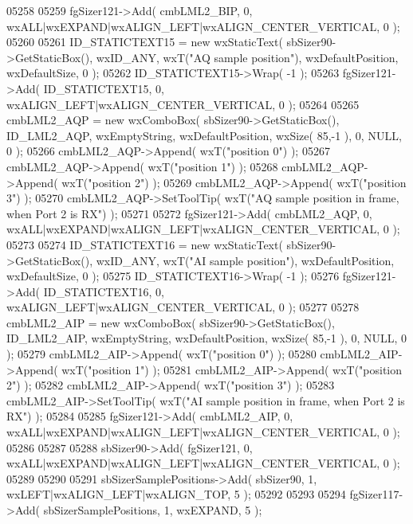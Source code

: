 \begin{DoxyCode}
05258     
05259     fgSizer121->Add( cmbLML2_BIP, 0, wxALL|wxEXPAND|wxALIGN\_LEFT|wxALIGN\_CENTER\_VERTICAL, 0 );
05260     
05261     ID_STATICTEXT15 = \textcolor{keyword}{new} wxStaticText( sbSizer90->GetStaticBox(), wxID\_ANY, wxT(\textcolor{stringliteral}{"AQ sample position"}), 
      wxDefaultPosition, wxDefaultSize, 0 );
05262     ID_STATICTEXT15->Wrap( -1 );
05263     fgSizer121->Add( ID_STATICTEXT15, 0, wxALIGN\_LEFT|wxALIGN\_CENTER\_VERTICAL, 0 );
05264     
05265     cmbLML2_AQP = \textcolor{keyword}{new} wxComboBox( sbSizer90->GetStaticBox(), ID_LML2_AQP, wxEmptyString, wxDefaultPosition,
       wxSize( 85,-1 ), 0, NULL, 0 );
05266     cmbLML2_AQP->Append( wxT(\textcolor{stringliteral}{"position 0"}) );
05267     cmbLML2_AQP->Append( wxT(\textcolor{stringliteral}{"position 1"}) );
05268     cmbLML2_AQP->Append( wxT(\textcolor{stringliteral}{"position 2"}) );
05269     cmbLML2_AQP->Append( wxT(\textcolor{stringliteral}{"position 3"}) );
05270     cmbLML2_AQP->SetToolTip( wxT(\textcolor{stringliteral}{"AQ sample position in frame, when Port 2 is RX"}) );
05271     
05272     fgSizer121->Add( cmbLML2_AQP, 0, wxALL|wxEXPAND|wxALIGN\_LEFT|wxALIGN\_CENTER\_VERTICAL, 0 );
05273     
05274     ID_STATICTEXT16 = \textcolor{keyword}{new} wxStaticText( sbSizer90->GetStaticBox(), wxID\_ANY, wxT(\textcolor{stringliteral}{"AI sample position"}), 
      wxDefaultPosition, wxDefaultSize, 0 );
05275     ID_STATICTEXT16->Wrap( -1 );
05276     fgSizer121->Add( ID_STATICTEXT16, 0, wxALIGN\_LEFT|wxALIGN\_CENTER\_VERTICAL, 0 );
05277     
05278     cmbLML2_AIP = \textcolor{keyword}{new} wxComboBox( sbSizer90->GetStaticBox(), ID_LML2_AIP, wxEmptyString, wxDefaultPosition,
       wxSize( 85,-1 ), 0, NULL, 0 );
05279     cmbLML2_AIP->Append( wxT(\textcolor{stringliteral}{"position 0"}) );
05280     cmbLML2_AIP->Append( wxT(\textcolor{stringliteral}{"position 1"}) );
05281     cmbLML2_AIP->Append( wxT(\textcolor{stringliteral}{"position 2"}) );
05282     cmbLML2_AIP->Append( wxT(\textcolor{stringliteral}{"position 3"}) );
05283     cmbLML2_AIP->SetToolTip( wxT(\textcolor{stringliteral}{"AI sample position in frame, when Port 2 is RX"}) );
05284     
05285     fgSizer121->Add( cmbLML2_AIP, 0, wxALL|wxEXPAND|wxALIGN\_LEFT|wxALIGN\_CENTER\_VERTICAL, 0 );
05286     
05287     
05288     sbSizer90->Add( fgSizer121, 0, wxALL|wxEXPAND|wxALIGN\_LEFT|wxALIGN\_CENTER\_VERTICAL, 0 );
05289     
05290     
05291     sbSizerSamplePositions->Add( sbSizer90, 1, wxLEFT|wxALIGN\_LEFT|wxALIGN\_TOP, 5 );
05292     
05293     
05294     fgSizer117->Add( sbSizerSamplePositions, 1, wxEXPAND, 5 );

\end{DoxyCode}
